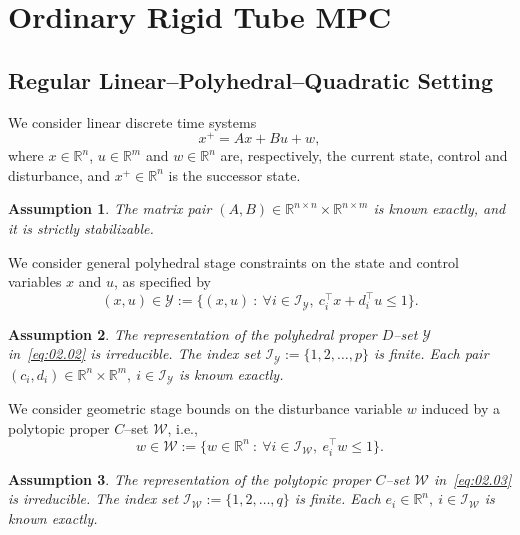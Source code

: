 \documentclass[twocolumn]{autart}
\newtheorem{assumption}{Assumption}
\newcommand{\mb}[1]{\mathbb{#1}}
\newcommand{\mc}[1]{\mathcal{#1}}
\newcommand{\R}{\mb{R}}
\newcommand{\Rnm}[2]{\R^{{#1}\times{#2}}}
\numberwithin{equation}{section}
\begin{document}
\section{Ordinary Rigid Tube MPC}
\label{sec:02}

\subsection{Regular Linear--Polyhedral--Quadratic Setting}
\label{sec:02.01}
We consider linear discrete time systems 
\begin{equation}
\label{eq:02.01}
  x^+=Ax+Bu+w,
\end{equation}
where $x\in \R^n$, $u\in \R^m$ and $w\in \R^n$ are, respectively, the current state, control and disturbance, and $x^+ \in\R^n$ is the successor state. 
\begin{assumption}
\label{ass:02.01}
The matrix pair $(A,B)\in \Rnm{n}{n}\times\Rnm{n}{m}$ is known exactly, and it is strictly stabilizable.
\end{assumption}

We consider general polyhedral stage constraints on the state and control variables $x$ and $u$, as specified by
\begin{equation}
\label{eq:02.02}
(x,u)\in \mc{Y}:=\{(x,u)\ :\ \forall i\in\mc{I}_\mc{Y},\ c_i^\top x+d_i^\top u\le 1\}.
\end{equation}

\begin{assumption}
\label{ass:02.02}
The representation of the polyhedral proper $D$--set $\mc{Y}$ in~\eqref{eq:02.02} is irreducible. The index set $\mc{I}_\mc{Y}:=\{1,2,\ldots,p\}$ is finite. Each pair $(c_i,d_i)\in\R^n\times\R^m,\ i\in\mc{I}_\mc{Y}$ is known exactly.
\end{assumption}

We consider geometric stage bounds on the disturbance variable $w$ induced by a polytopic proper $C$--set $\mc{W}$, i.e.,
\begin{equation}
\label{eq:02.03}
w\in \mc{W}:=\{w\in\R^n\ :\ \forall i\in\mc{I}_\mc{W},\ e_i^\top w\le 1\}.
\end{equation}

\begin{assumption}
\label{ass:02.03}
The representation of the polytopic proper $C$--set $\mc{W}$ in~\eqref{eq:02.03} is irreducible. The index set $\mc{I}_\mc{W}:=\{1,2,\ldots,q\}$ is finite. Each $e_i\in\R^n,\ i\in\mc{I}_\mc{W}$ is known exactly.
\end{assumption}
\end{document}
